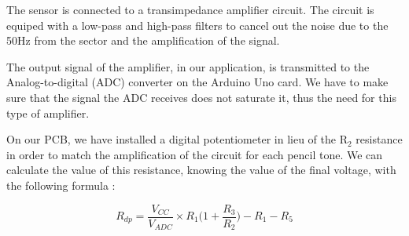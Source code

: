 \documentclass[10pt]{datasheet}
\begin{document}
The sensor is connected to a transimpedance amplifier circuit. The circuit is equiped with a 
low-pass and high-pass filters to cancel out the noise due to the 50Hz from the sector and the amplification 
of the signal. 

The output signal of the amplifier, in our application, is transmitted to the Analog-to-digital (ADC) converter on the Arduino Uno
card. We have to make sure that the signal the ADC receives does not saturate it, thus the need for this type of amplifier. 

On our PCB, we have installed a digital potentiometer in lieu of the $\text{R}_2$ resistance in order to match the amplification of the circuit
for each pencil tone. We can calculate the value of this resistance, knowing the value of the final voltage, with the following formula :

\begin{equation*}
    R_{dp} = \frac{V_{CC}}{V_{ADC}}\times R_1\Big(1 + \frac{R_3}{R_2}\Big) - R_1 - R_5
\end{equation*}
\end{document}
